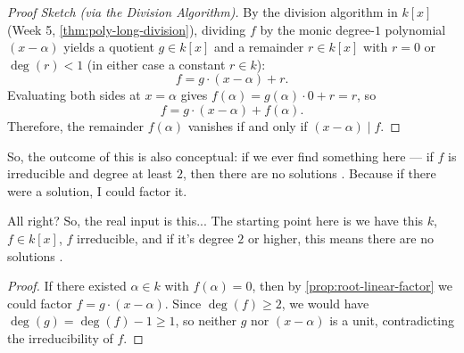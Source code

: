 \begin{content}

\begin{proof}[Proof Sketch (via the Division Algorithm)]
By the division algorithm in $k[x]$ (Week 5, \cref{thm:poly-long-division}), dividing $f$ by the monic degree-$1$ polynomial $(x - \alpha)$ yields a quotient $g \in k[x]$ and a remainder $r \in k[x]$ with $r = 0$ or $\deg(r) < 1$ (in either case a constant $r \in k$):
\[
f = g \cdot (x - \alpha) + r.
\]
Evaluating both sides at $x = \alpha$ gives $f(\alpha) = g(\alpha) \cdot 0 + r = r$, so
\[
f = g \cdot (x - \alpha) + f(\alpha).
\]
Therefore, the remainder $f(\alpha)$ vanishes if and only if $(x - \alpha) \mid f$.
\end{proof}
\end{content}

\begin{speech}[00:56:32 - 00:57:30]
So, the outcome of this is also conceptual: if we ever find something here --- if $f$ is irreducible and degree at least $2$, then there are no solutions . Because if there were a solution, I could factor it.

All right? So, the real input is this... The starting point here is we have this $k$, $f \in k[x]$, $f$ irreducible, and if it's degree $2$ or higher, this means there are no solutions .
\end{speech}

\begin{content}

\begin{proof}
If there existed $\alpha \in k$ with $f(\alpha) = 0$, then by \cref{prop:root-linear-factor} we could factor $f = g \cdot (x - \alpha)$. Since $\deg(f) \ge 2$, we would have $\deg(g) = \deg(f) - 1 \ge 1$, so neither $g$ nor $(x - \alpha)$ is a unit, contradicting the irreducibility of $f$.
\end{proof}
\end{content}

